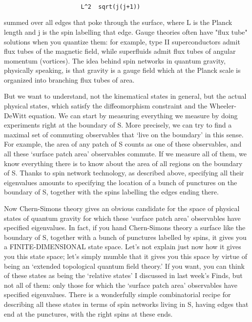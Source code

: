 \begin{verbatim}

                      L^2  sqrt(j(j+1))
\end{verbatim}
    

summed over all edges that poke through the surface, where
L is the Planck length and j is the spin labelling that edge.
Gauge theories often have "flux tube" solutions when you quantize
them: for example, type II superconductors admit flux tubes of
the magnetic field, while superfluids admit flux tubes of
angular momentum (vortices).  The idea behind spin networks in quantum
gravity, physically speaking, is that gravity is a gauge field
which at the Planck scale is organized into branching flux tubes
of area.

But we want to understand, not the kinematical states in general, but
the actual physical states, which satisfy the diffeomorphism constraint
and the Wheeler-DeWitt equation. We can start by measuring everything we
measure by doing experiments right at the boundary of S.  More precisely, we 
can try to find a maximal set of commuting observables that `live on the 
boundary' in this sense.  For example, the area of any patch of S counts 
as one of these observables, and all these `surface patch area' 
observables commute.  If we measure all of them, we know everything 
there is to know about the area of all regions on the 
boundary of S.  Thanks to spin network technology, as described above,
specifying all their eigenvalues amounts to specifying the location of 
a bunch of punctures on the boundary of S, together with the spins 
labelling the edges ending there.

Now Chern-Simons theory gives an obvious candidate for the space of
physical states of quantum gravity for which these `surface patch area' 
observables have specified eigenvalues.  In fact, if you hand Chern-Simons 
theory a surface like the boundary of S, together with a bunch of punctures
labelled by spins, it gives you a FINITE-DIMENSIONAL state space. 
Let's not explain just now how it gives you this state space; let's simply
mumble that it gives you this space by virtue of being an `extended topological
quantum field theory.'  If you want, you can think of these states as being
the `relative states' I discussed in last week's Finds, but not all of them: 
only those for which the `surface patch area' observables have specified 
eigenvalues.   There is a wonderfully simple combinatorial recipe for 
describing all these states in terms of spin networks living in S, having
edges that end at the punctures, with the right spins at these ends.
 
